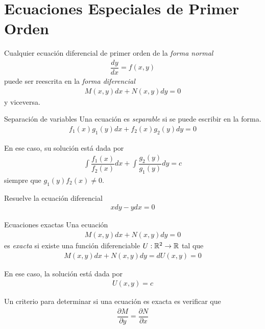 \section{Ecuaciones Especiales de Primer Orden}

{}
  Cualquier ecuación diferencial de primer orden de la \emph{forma normal}
     \begin{align*}
   \dfrac{dy}{dx} = f(x,y)
   \end{align*}
   puede ser reescrita en la \emph{forma diferencial}
       \begin{align*}
    M(x,y)dx+N(x,y)dy =0
    \end{align*} 
    y  viceversa. 

{Separación de variables}
Una ecuación es \emph{separable} si se puede escribir en la forma. 
 \begin{align*}
 f_{1}(x)g_{1}(y)dx+f_{2}(x)g_{2}(y)dy = 0
 \end{align*}
 
{}
En ese caso, su solución  está dada por
   \begin{align*}
       \displaystyle \int \dfrac{f_{1}(x)}{f_{2}(x)}dx
       + \int \dfrac{g_{2}(y)}{g_{1}(y)}dy = c
  \end{align*}
  siempre que $g_{1}(y)f_{2}(x)\neq 0$.


	\begin{problema}
		Resuelve la ecuación diferencial
		\begin{align*}
		xdy-ydx=0
		\end{align*}
	\end{problema}

{Ecuaciones exactas}
  Una ecuación
     \begin{align*}
   M(x,y)dx + N(x,y)dy = 0
   \end{align*}
   es \emph{exacta} si 
   existe una función diferenciable $U:\mathbb{R}^{2}\to \mathbb{R}$ tal que
       \begin{align*}
       M(x,y)dx + N(x,y)dy = dU(x,y) = 0 
    \end{align*}
 

En ese caso, la solución está dada por                                         \begin{align*}
U(x,y) = c
\end{align*}

{}
Un criterio para determinar si una ecuación es exacta es verificar que 
\begin{align*}
    \dfrac{\partial M}{\partial y}= \dfrac{\partial N}{\partial x}
    \end{align*}

